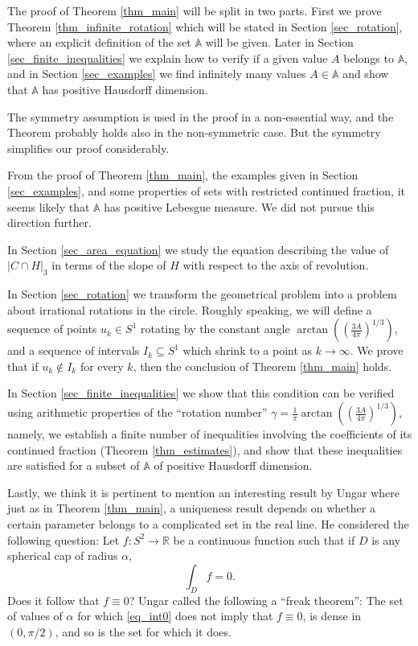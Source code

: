\documentclass{amsart}
\def \R{\mathbb R}
\newcommand \vol[2][3]{\left|#2\right|_{#1}}
\begin{document}
The proof of Theorem \ref{thm_main} will be split in two parts.
First we prove Theorem \ref{thm_infinite_rotation} which will be stated in Section \ref{sec_rotation}, where an explicit definition of the set $\mathbb A$ will be given.
Later in Section \ref{sec_finite_inequalities} we explain how to verify if a given value $A$ belongs to $\mathbb A$, and in Section \ref{sec_examples} we find infinitely many values $A \in \mathbb A$ and show that $\mathbb A$ has positive Hausdorff dimension.

The symmetry assumption is used in the proof in a non-essential way, and the Theorem probably holds also in the non-symmetric case.
But the symmetry simplifies our proof considerably.

From the proof of Theorem \ref{thm_main}, the examples given in Section \ref{sec_examples}, and some properties of sets with restricted continued fraction, it seems likely that $\mathbb A$ has positive Lebesgue measure.
We did not pursue this direction further.

In Section \ref{sec_area_equation} we study the equation describing the value of $\vol[3]{C \cap H}$ in terms of the slope of $H$ with respect to the axis of revolution.

In Section \ref{sec_rotation} we transform the geometrical problem into a problem about irrational rotations in the circle. Roughly speaking, we will define a sequence of points $u_k \in S^1$ rotating by the constant angle $\arctan((\frac{3A}{4\pi})^{1/3})$, and a sequence of intervals $I_k \subseteq S^1$ which shrink to a point as $k \to \infty$.
We prove that if $u_k \not\in I_k$ for every $k$, then the conclusion of Theorem \ref{thm_main} holds.

In Section \ref{sec_finite_inequalities} we show that this condition can be verified using arithmetic properties of the ``rotation number'' $\gamma = \frac 1\pi \arctan((\frac{3A}{4\pi})^{1/3})$, namely, we establish a finite number of inequalities involving the coefficients of its continued fraction (Theorem \ref{thm_estimates}), and show that these inequalities are satisfied for a subset of $\mathbb A$ of positive Hausdorff dimension.

Lastly, we think it is pertinent to mention an interesting result by Ungar \cite{ungar1954freak} where just as in Theorem \ref{thm_main}, a uniqueness result depends on whether a certain parameter belongs to a complicated set in the real line.
He considered the following question:
Let $f:S^2 \to \R$ be a continuous function such that if $D$ is any spherical cap of radius $\alpha$,
\begin{equation} \label{eq_int0} \int_D f = 0.\end{equation}
Does it follow that $f \equiv 0$?
Ungar called the following a ``freak theorem'':
The set of values of $\alpha$ for which \eqref{eq_int0} does not imply that $f \equiv 0$, is dense in $(0, \pi/2)$, and so is the set for which it does.
\end{document}
